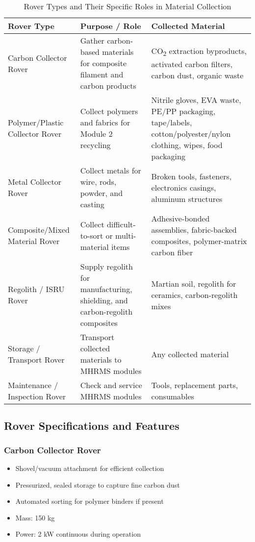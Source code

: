\documentclass[12pt, a4paper]{article}
\begin{document}
\begin{table}[h!]
\centering
\small
\renewcommand{\arraystretch}{1.4}
\setlength{\tabcolsep}{8pt}
\begin{tabular}{p{} p{} p{}}
\toprule
\textbf{Rover Type} & \textbf{Purpose / Role} & \textbf{Collected Material} \\
\midrule
Carbon Collector Rover & Gather carbon-based materials for composite filament and carbon products & CO\textsubscript{2} extraction byproducts, activated carbon filters, carbon dust, organic waste \\[0.5em]

Polymer/Plastic Collector Rover & Collect polymers and fabrics for Module 2 recycling & Nitrile gloves, EVA waste, PE/PP packaging, tape/labels, cotton/polyester/nylon clothing, wipes, food packaging \\[0.5em]

Metal Collector Rover & Collect metals for wire, rods, powder, and casting & Broken tools, fasteners, electronics casings, aluminum structures \\[0.5em]

Composite/Mixed Material Rover & Collect difficult-to-sort or multi-material items & Adhesive-bonded assemblies, fabric-backed composites, polymer-matrix carbon fiber \\[0.5em]

Regolith / ISRU Rover & Supply regolith for manufacturing, shielding, and carbon-regolith composites & Martian soil, regolith for ceramics, carbon-regolith mixes \\[0.5em]

Storage / Transport Rover & Transport collected materials to MHRMS modules & Any collected material \\[0.5em]

Maintenance / Inspection Rover & Check and service MHRMS modules & Tools, replacement parts, consumables \\
\bottomrule
\end{tabular}
\caption{Rover Types and Their Specific Roles in Material Collection}
\end{table}

\normalsize

\subsection{Rover Specifications and Features}

\subsubsection{Carbon Collector Rover}
\begin{itemize}
    \item Shovel/vacuum attachment for efficient collection
    \item Pressurized, sealed storage to capture fine carbon dust
    \item Automated sorting for polymer binders if present
    \item Mass: 150 kg
    \item Power: 2 kW continuous during operation
\end{itemize}
\end{document}
